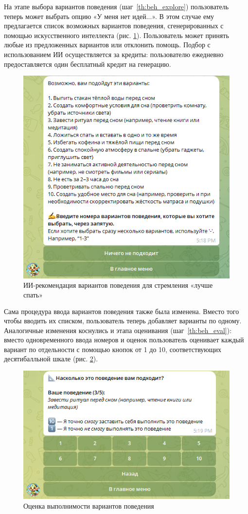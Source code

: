 \documentclass[pdflatex,sn-mathphys-num]{sn-jnl}%
\theoremstyle{thmstyleone}%
\theoremstyle{thmstyletwo}%
\theoremstyle{thmstylethree}%
\begin{document}
На этапе выбора вариантов поведения (шаг~\ref{th:beh_explore}) пользователь теперь может выбрать опцию «У меня нет идей...». В этом случае ему предлагается список возможных вариантов поведения, сгенерированных с помощью искусственного интеллекта (рис. \ref{fig:bot_ai_recommend.png}). Пользователь может принять любые из предложенных вариантов или отклонить помощь. Подбор с использованием ИИ осуществляется за кредиты: пользователю ежедневно предоставляется один бесплатный кредит на генерацию.

\begin{figure}
    \centering
    \includegraphics[width=0.6\linewidth]{figures/Bot/bot_ai_recommend.png}
    \caption{ИИ-рекомендация вариантов поведения для стремления «лучше спать»}
    \label{fig:bot_ai_recommend.png}
\end{figure}

Сама процедура ввода вариантов поведения также была изменена. Вместо того чтобы вводить их списком, пользователь теперь добавляет варианты по одному. Аналогичные изменения коснулись и этапа оценивания (шаг~\ref{th:beh_eval}): вместо одновременного ввода номеров и оценок пользователь оценивает каждый вариант по отдельности с помощью кнопок от 1 до 10, соответствующих десятибалльной шкале (рис. \ref{fig:bot_beh_eval}).

\begin{figure}
    \centering
    \includegraphics[width=0.6\linewidth]{figures/Bot/bot_beh_eval.png}
    \caption{Оценка выполнимости вариантов поведения}
    \label{fig:bot_beh_eval}
\end{figure}
\end{document}
